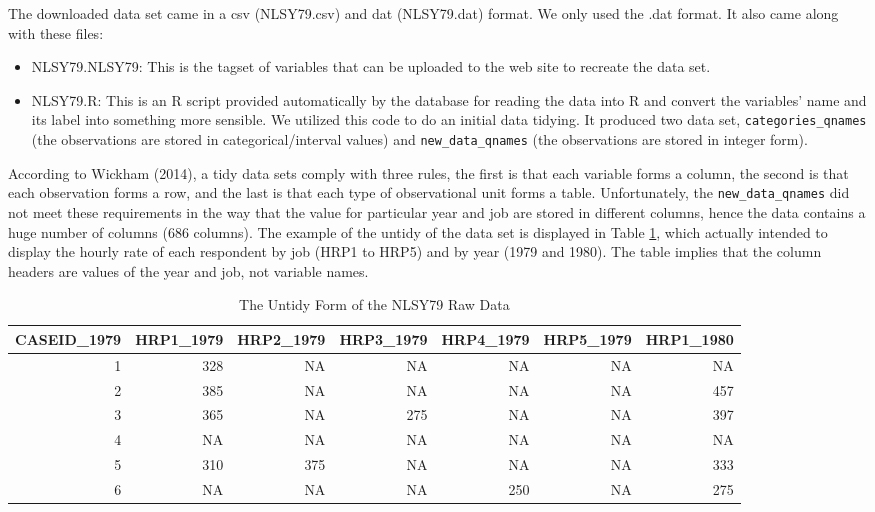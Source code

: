 \documentclass{article}
\begin{document}
The downloaded data set came in a csv (NLSY79.csv) and dat (NLSY79.dat) format. We only used the .dat format. It also came along with these files:

\begin{itemize}
\tightlist
\item
  NLSY79.NLSY79: This is the tagset of variables that can be uploaded to the web site to recreate the data set.
\item
  NLSY79.R: This is an R script provided automatically by the database for reading the data into R and convert the variables' name and its label into something more sensible. We utilized this code to do an initial data tidying. It produced two data set, \texttt{categories\_qnames} (the observations are stored in categorical/interval values) and \texttt{new\_data\_qnames} (the observations are stored in integer form).
\end{itemize}

According to Wickham (2014), a tidy data sets comply with three rules, the first is that each variable forms a column, the second is that each observation forms a row, and the last is that each type of observational unit forms a table. Unfortunately, the \texttt{new\_data\_qnames} did not meet these requirements in the way that the value for particular year and job are stored in different columns, hence the data contains a huge number of columns (686 columns). The example of the untidy of the data set is displayed in Table \ref{tab:untidy-data}, which actually intended to display the hourly rate of each respondent by job (HRP1 to HRP5) and by year (1979 and 1980). The table implies that the column headers are values of the year and job, not variable names.

\begin{table}

\caption{\label{tab:untidy-data}The Untidy Form of the NLSY79 Raw Data}
\centering
\begin{tabular}[t]{r|r|r|r|r|r|r}
\hline
CASEID\_1979 & HRP1\_1979 & HRP2\_1979 & HRP3\_1979 & HRP4\_1979 & HRP5\_1979 & HRP1\_1980\\
\hline
\rowcolor{gray!6}  1 & 328 & NA & NA & NA & NA & NA\\
\hline
2 & 385 & NA & NA & NA & NA & 457\\
\hline
\rowcolor{gray!6}  3 & 365 & NA & 275 & NA & NA & 397\\
\hline
4 & NA & NA & NA & NA & NA & NA\\
\hline
\rowcolor{gray!6}  5 & 310 & 375 & NA & NA & NA & 333\\
\hline
6 & NA & NA & NA & 250 & NA & 275\\
\hline
\end{tabular}
\end{table}
\end{document}
